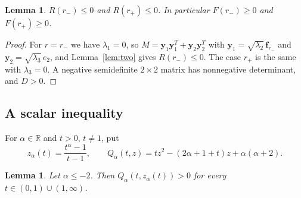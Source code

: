 \documentclass[11pt]{amsart}
\newtheorem{lemma}[theorem]{Lemma}
\theoremstyle{definition}
\theoremstyle{remark}
\numberwithin{equation}{section}
\newcommand{\R}{\mathbb{R}}
\newcommand{\by}{\mathbf{y}}
\newcommand{\bff}{\mathbf{f}}
\begin{document}
\begin{lemma}\label{lem:endpoints}
$R(r_-)\le0$ and $R(r_+)\le0$. In particular $F(r_-)\ge0$ and $F(r_+)\ge0$.
\end{lemma}

\begin{proof}
For $r=r_-$ we have $\lambda_1=0$, so $M=\by_1\by_1^T+\by_2\by_2^T$ with $\by_1=\sqrt{\lambda_2}\,\bff_{r_-}$ and $\by_2=\sqrt{\lambda_3}\,e_2$, and Lemma~\ref{lem:two} gives $R(r_-)\le0$. The case $r_+$ is the same with $\lambda_3=0$. A negative semidefinite $2\times2$ matrix has nonnegative determinant, and $D>0$.
\end{proof}

\subsection{A scalar inequality}
For $\alpha\in\R$ and $t>0$, $t\ne1$, put
\[
z_\alpha(t)=\frac{t^\alpha-1}{t-1},\qquad Q_\alpha(t,z)=tz^2-(2\alpha+1+t)z+\alpha(\alpha+2).
\]

\begin{lemma}\label{lem:scalar}
Let $\alpha\le-2$. Then $Q_\alpha(t,z_\alpha(t))>0$ for every $t\in(0,1)\cup(1,\infty)$.
\end{lemma}
\end{document}
